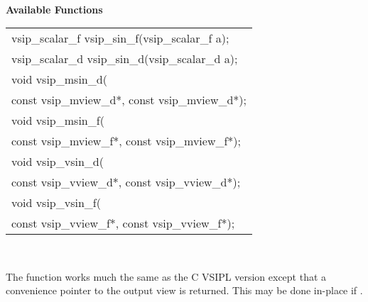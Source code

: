 \\\cvsiplh
\newline \hspace*{.8cm} \vspace*{.1cm} \textbf{Available Functions }
\newline \hspace*{1.1cm} {
\ttfamily
\begin{tabular}[H]{l}
vsip\_scalar\_f vsip\_sin\_f(vsip\_scalar\_f a);\\
vsip\_scalar\_d vsip\_sin\_d(vsip\_scalar\_d a);\\
void vsip\_msin\_d(\\*
\hspace{1cm}const vsip\_mview\_d*, const vsip\_mview\_d*);\\
void vsip\_msin\_f(\\*
\hspace{1cm}const vsip\_mview\_f*, const vsip\_mview\_f*);\\
void vsip\_vsin\_d(\\*
\hspace{1cm}const vsip\_vview\_d*, const vsip\_vview\_d*);\\
void vsip\_vsin\_f(\\*
\hspace{1cm}const vsip\_vview\_f*, const vsip\_vview\_f*);\\
\end{tabular}
}
\\\pyjvsiph
{}
\newline\hspace*{1.2cm}\parbox{10.8cm}{\vspace*{.1cm}The  function works much the same as the C VSIPL version except that a convenience pointer to the output view is returned. This may be done in-place if .}
